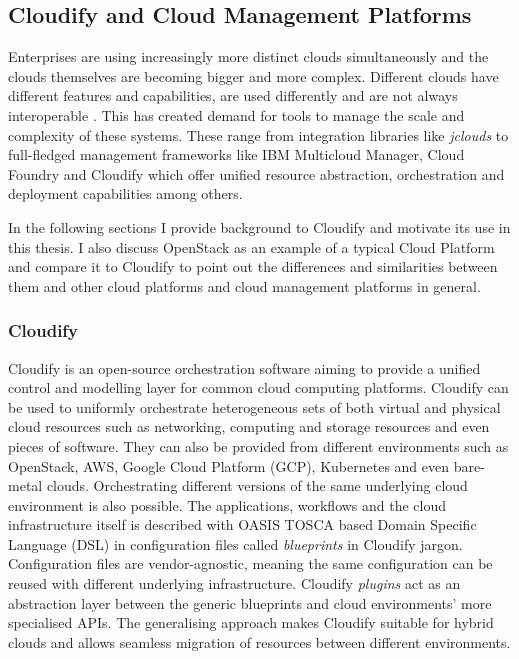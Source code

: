 \subsection{Cloudify and Cloud Management Platforms}

Enterprises are using increasingly more distinct clouds simultaneously \cite{stateofthecloud} and the clouds themselves are becoming bigger and more complex. Different clouds have different features and capabilities, are used differently and are not always interoperable \cite{multicloudprovisioning}. This has created demand for tools to manage the scale and complexity of these systems. These range from integration libraries like \textit{jclouds} \cite{jclouds} to full-fledged management frameworks like IBM Multicloud Manager, Cloud Foundry and Cloudify \cite{ibmmulticloud,cloudfoundry,cloudify} which offer unified resource abstraction, orchestration and deployment capabilities among others.

In the following sections I provide background to Cloudify and motivate its use in this thesis. I also discuss OpenStack as an example of a typical Cloud Platform and compare it to Cloudify to point out the differences and similarities between them and other cloud platforms and cloud management platforms in general.

\subsubsection{Cloudify}

Cloudify \cite{cloudify} is an open-source orchestration software aiming to provide a unified control and modelling layer for common cloud computing platforms. Cloudify can be used to uniformly orchestrate heterogeneous sets of both virtual and physical cloud resources such as networking, computing and storage resources and even pieces of software. They can also be provided from different environments such as OpenStack, AWS, Google Cloud Platform (GCP), Kubernetes and even bare-metal clouds. Orchestrating different versions of the same underlying cloud environment is also possible. The applications, workflows and the cloud infrastructure itself is described with OASIS TOSCA \cite{Tosca} based Domain Specific Language (DSL) in configuration files called \textit{blueprints} in Cloudify jargon. Configuration files are vendor-agnostic, meaning the same configuration can be reused with different underlying infrastructure. Cloudify \textit{plugins} act as an abstraction layer between the generic blueprints and cloud environments' more specialised APIs. The generalising approach makes Cloudify suitable for hybrid clouds and allows seamless migration of resources between different environments.

